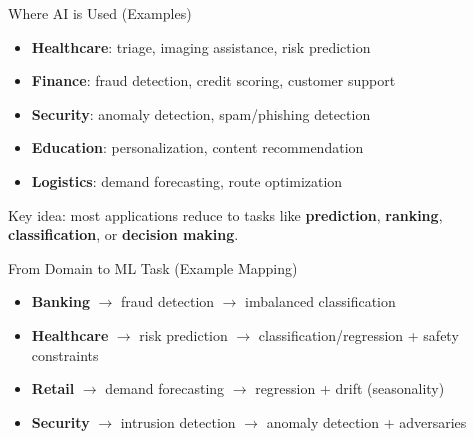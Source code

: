 \documentclass[aspectratio=169]{beamer}
\begin{document}
\begin{frame}{Where AI is Used (Examples)}
  \begin{itemize}[<+->]
    \item \textbf{Healthcare}: triage, imaging assistance, risk prediction
    \item \textbf{Finance}: fraud detection, credit scoring, customer support
    \item \textbf{Security}: anomaly detection, spam/phishing detection
    \item \textbf{Education}: personalization, content recommendation
    \item \textbf{Logistics}: demand forecasting, route optimization
  \end{itemize}
  \vspace{0.4em}
  Key idea: most applications reduce to tasks like \textbf{prediction}, \textbf{ranking}, \textbf{classification}, or \textbf{decision making}.
\end{frame}

\begin{frame}{From Domain to ML Task (Example Mapping)}
  \begin{itemize}[<+->]
    \item \textbf{Banking} $\rightarrow$ fraud detection $\rightarrow$ imbalanced classification
    \item \textbf{Healthcare} $\rightarrow$ risk prediction $\rightarrow$ classification/regression + safety constraints
    \item \textbf{Retail} $\rightarrow$ demand forecasting $\rightarrow$ regression + drift (seasonality)
    \item \textbf{Security} $\rightarrow$ intrusion detection $\rightarrow$ anomaly detection + adversaries
  \end{itemize}
\end{frame}
\end{document}
